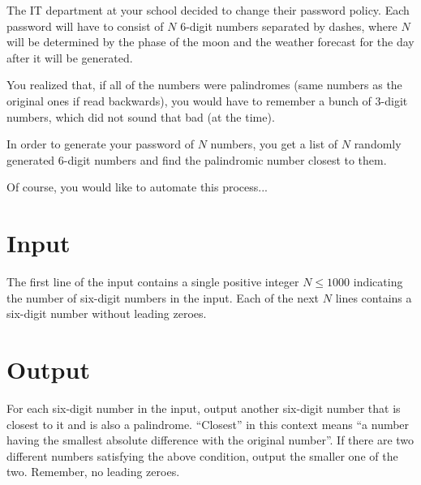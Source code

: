 
The IT department at your school decided to change their password policy. Each 
password will have to consist of $N$ $6$-digit numbers separated by dashes, 
where $N$ will be determined by the phase of the moon and the weather 
forecast for the day after it will be generated.

You realized that, if all of the numbers were palindromes (same numbers as 
the original ones if read backwards), you would have to remember a bunch 
of $3$-digit numbers, which did not sound that bad (at the time).

In order to generate your password of $N$ numbers, you get a list of $N$ 
randomly generated $6$-digit numbers and find the palindromic number closest 
to them.

Of course, you would like to automate this process...

\section*{Input} 
The first line of the input contains a single positive 
integer $N \leq 1000$ indicating the number of six-digit numbers in the 
input. Each of the next $N$ lines contains a six-digit number without 
leading zeroes.

\section*{Output}

For each six-digit number in the input, output another six-digit number 
that is closest to it and is also a palindrome. ``Closest'' in this 
context means ``a number having the smallest absolute difference with the 
original number''. If there are two different numbers satisfying the above 
condition, output the smaller one of the two. Remember, no leading zeroes.
